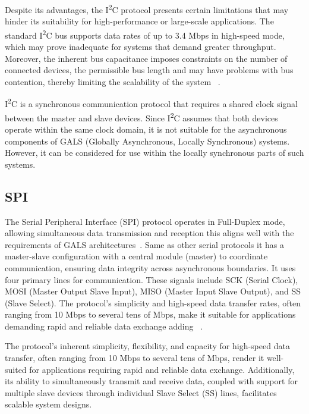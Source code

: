 Despite its advantages, the I\textsuperscript{2}C  protocol presents certain limitations that may hinder its suitability for high-performance or large-scale applications. The standard I\textsuperscript{2}C bus supports data rates of up to 3.4 Mbps in high-speed mode, which may prove inadequate for systems that demand greater throughput. Moreover, the inherent bus capacitance imposes constraints on the number of connected devices, the permissible bus length and may have problems with bus contention, thereby limiting the scalability of the system ~\cite{I2Cv2}.

I\textsuperscript{2}C is a synchronous communication protocol that requires a shared clock signal between the master and slave devices. Since I\textsuperscript{2}C assumes that both devices operate within the same clock domain, it is not suitable for the asynchronous components of GALS (Globally Asynchronous, Locally Synchronous) systems. However, it can be considered for use within the locally synchronous parts of such systems.

\subsection{SPI}
\label{subsub:spi}

The Serial Peripheral Interface (SPI) protocol operates in Full-Duplex mode, allowing simultaneous data transmission and reception this aligns well with the requirements of GALS architectures~\cite{spisite}. Same as other serial protocols it has a master-slave configuration with a central module (master) to coordinate communication, ensuring data integrity across asynchronous boundaries. It uses four primary lines for communication. These signals include SCK (Serial Clock), MOSI (Master Output Slave Input), MISO (Master Input Slave Output), and SS (Slave Select). The protocol's simplicity and high-speed data transfer rates, often ranging from 10 Mbps to several tens of Mbps, make it suitable for applications demanding rapid and reliable data exchange adding ~\cite{spisite}.

The protocol’s inherent simplicity, flexibility, and capacity for high-speed data transfer, often ranging from 10 Mbps to several tens of Mbps, render it well-suited for applications requiring rapid and reliable data exchange. Additionally, its ability to simultaneously transmit and receive data, coupled with support for multiple slave devices through individual Slave Select (SS) lines, facilitates scalable system designs.

